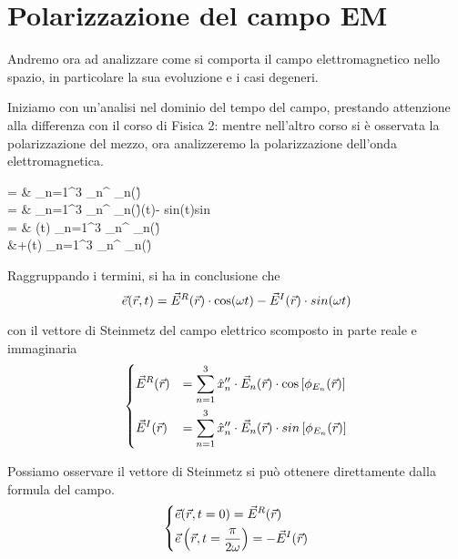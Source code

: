 \chapter{Polarizzazione del campo \textsc{EM}}
Andremo ora ad analizzare come si comporta il campo elettromagnetico nello spazio, in particolare la sua evoluzione e i casi degeneri.

Iniziamo con un'analisi nel dominio del tempo del campo, prestando attenzione alla differenza con il corso di Fisica 2: mentre nell'altro corso si è osservata la polarizzazione del mezzo, ora analizzeremo la polarizzazione dell'onda elettromagnetica.
\begin{esp}
	\ert = & \sum\limits_{n=1}^3 _n^{\prime\prime} \cdot \E_n(\r)\cdot \cos{} \\
	= & \sum\limits_{n=1}^3 _n^{\prime\prime} \cdot \E_n(\r)\cdot \left\lbrace\cos(\omega t)\cdot \cos{} - sin(\omega t)\cdot sin\right\rbrace\\
	= & \cos(\omega t) \cdot \sum\limits_{n=1}^3 _n^{\prime\prime} \cdot \E_n(\r)\cdot \cos {} \\
	&+\sin(\omega t) \cdot \sum\limits_{n=1}^3 _n^{\prime\prime} \cdot \E_n(\r)\cdot \sin {} \\
\end{esp}

Raggruppando i termini, si ha in conclusione che
\begin{equation} \label{eq:ert}
	\vec{e}(\vec{r},t) = \vec{E}^R(\vec{r})\cdot \cos(\omega t) - \vec{E}^I(\vec{r})\cdot sin(\omega t)
\end{equation}

\newpage
con il vettore di Steinmetz del campo elettrico scomposto in parte reale e immaginaria
\begin{equation*} \begin{dcases}
	\vec{E}^R(\vec{r}) &= \sum\limits_{n=1}^3 \hat{x}_n^{\prime\prime} \cdot \vec{E}_n(\vec{r})\cdot \cos \left[ \phi_{E_n}(\vec{r}) \right] \\
	\vec{E}^I(\vec{r}) &= \sum\limits_{n=1}^3 \hat{x}_n^{\prime\prime} \cdot \vec{E}_n(\vec{r})\cdot sin \left[ \phi_{E_n}(\vec{r}) \right]
\end{dcases} \end{equation*}

Possiamo osservare il vettore di Steinmetz si può ottenere direttamente dalla formula del campo.
\begin{equation*} \begin{dcases}
	\vec{e}(\vec{r}, t=0) = \vec{E}^R(\vec{r}) \\
	\vec{e} \left( \vec{r}, t = \frac{\pi}{2\omega} \right) = -\vec{E}^I(\vec{r})
\end{dcases} \end{equation*}

